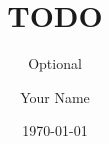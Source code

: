 \documentclass{beamer}
\title{TODO}
\subtitle{Optional}
\author{Your Name}
\date{\today}
\begin{document}
\begin{frame}
  \titlepage
\end{frame}
\end{document}
